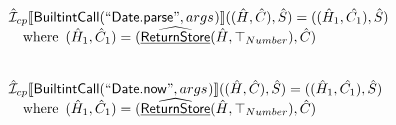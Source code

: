 \documentclass{article}
\newcommand{\SF}[1]{\mbox{\textsf{#1}}}
\newcommand{\wherec}[1]{{\rm where}\begin{array}[t]{l}#1\end{array}}
\newcommand{\aI}{\hat{\mathcal{I}}}
\newcommand{\lbr}{\llbracket}
\newcommand{\rbr}{\rrbracket}
\newcommand{\ahf}[1]{\widehat{\underline{\sf #1}}}
\begin{document}
\[\begin{array}{l}
\aI _{cp}\lbr \SF{BuiltintCall}(``\SF{Date.parse}",args_{})\rbr((\hat{H},\hat{C}), \hat{S})
  = ((\hat{H}_1, \hat{C_1}), \hat{S})\\
\quad\wherec{
  (\hat{H}_1, \hat{C}_1) = (\ahf{ReturnStore}(\hat{H},\top_{Number}), \hat{C})\\
  }\\
\\\\

\aI _{cp}\lbr \SF{BuiltintCall}(``\SF{Date.now}",args_{})\rbr((\hat{H},\hat{C}), \hat{S})
  = ((\hat{H}_1, \hat{C_1}), \hat{S})\\
\quad\wherec{
  (\hat{H}_1, \hat{C}_1) = (\ahf{ReturnStore}(\hat{H},\top_{Number}), \hat{C})\\
  }\\
\\\\




\end{array}
\]
\end{document}
